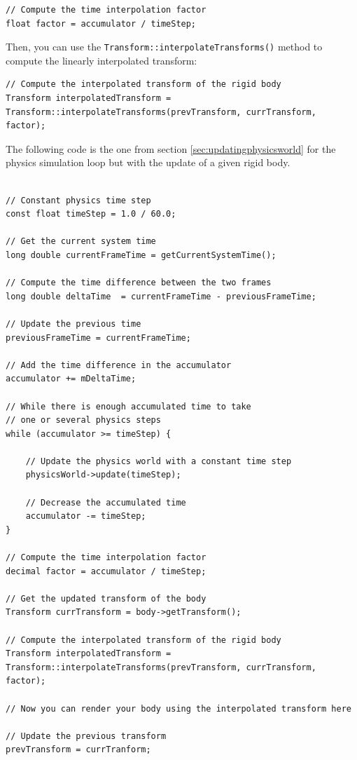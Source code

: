 \documentclass[a4paper,12pt]{article}
\begin{document}
    \begin{lstlisting}
// Compute the time interpolation factor
float factor = accumulator / timeStep;
    \end{lstlisting}

    \vspace{0.6cm}

    Then, you can use the \texttt{Transform::interpolateTransforms()} method to compute the linearly interpolated transform:  \\

    \begin{lstlisting}
// Compute the interpolated transform of the rigid body
Transform interpolatedTransform = Transform::interpolateTransforms(prevTransform, currTransform, factor);
  \end{lstlisting}

    \vspace{0.6cm}

    The following code is the one from section \ref{sec:updatingphysicsworld} for the physics simulation loop but with the update of a given rigid body. \\
    
    \begin{lstlisting}

// Constant physics time step
const float timeStep = 1.0 / 60.0;

// Get the current system time
long double currentFrameTime = getCurrentSystemTime();

// Compute the time difference between the two frames
long double deltaTime  = currentFrameTime - previousFrameTime;

// Update the previous time
previousFrameTime = currentFrameTime;

// Add the time difference in the accumulator
accumulator += mDeltaTime;

// While there is enough accumulated time to take
// one or several physics steps
while (accumulator >= timeStep) {

    // Update the physics world with a constant time step
    physicsWorld->update(timeStep);

    // Decrease the accumulated time
    accumulator -= timeStep;
}

// Compute the time interpolation factor
decimal factor = accumulator / timeStep;

// Get the updated transform of the body
Transform currTransform = body->getTransform();

// Compute the interpolated transform of the rigid body
Transform interpolatedTransform = Transform::interpolateTransforms(prevTransform, currTransform, factor);

// Now you can render your body using the interpolated transform here

// Update the previous transform
prevTransform = currTranform;

    \end{lstlisting}
\end{document}

